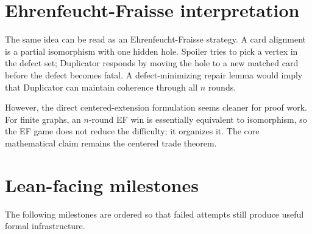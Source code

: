 \documentclass[11pt]{article}
\begin{document}
\section{Ehrenfeucht-Fraisse interpretation}

The same idea can be read as an Ehrenfeucht-Fraisse strategy.  A card
alignment is a partial isomorphism with one hidden hole.  Spoiler tries to
pick a vertex in the defect set; Duplicator responds by moving the hole to a
new matched card before the defect becomes fatal.  A defect-minimizing repair
lemma would imply that Duplicator can maintain coherence through all \(n\)
rounds.

However, the direct centered-extension formulation seems cleaner for proof
work.  For finite graphs, an \(n\)-round EF win is essentially equivalent to
isomorphism, so the EF game does not reduce the difficulty; it organizes it.
The core mathematical claim remains the centered trade theorem.

\section{Lean-facing milestones}

The following milestones are ordered so that failed attempts still produce
useful formal infrastructure.
\end{document}
